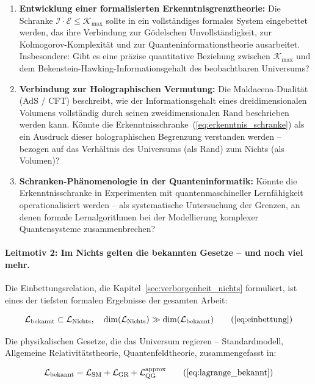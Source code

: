 ﻿\documentclass[12pt,a4paper]{report}
\begin{document}
\begin{enumerate}
	\item \textbf{Entwicklung einer formalisierten Erkenntnisgrenztheorie:} Die Schranke $\mathcal{I} \cdot \mathcal{E} \leq \mathcal{K}_{\max}$ sollte in ein vollständiges formales System eingebettet werden, das ihre Verbindung zur Gödelschen Unvollständigkeit, zur Kolmogorov-Komplexität und zur Quanteninformationstheorie ausarbeitet. Insbesondere: Gibt es eine präzise quantitative Beziehung zwischen $\mathcal{K}_{\max}$ und dem Bekenstein-Hawking-Informationsgehalt des beobachtbaren Universums?
	\item \textbf{Verbindung zur Holographischen Vermutung:} Die Maldacena-Dualität (AdS / CFT) beschreibt, wie der Informationsgehalt eines dreidimensionalen Volumens vollständig durch seinen zweidimensionalen Rand beschrieben werden kann. Könnte die Erkenntnisschranke~(\ref{eq:erkenntnis_schranke}) als ein Ausdruck dieser holographischen Begrenzung verstanden werden -- bezogen auf das Verhältnis des Universums (als Rand) zum Nichts (als Volumen)?
	\item \textbf{Schranken-Phänomenologie in der Quanteninformatik:} Könnte die Erkenntnisschranke in Experimenten mit quantenmaschineller Lernfähigkeit operationalisiert werden -- als systematische Untersuchung der Grenzen, an denen formale Lernalgorithmen bei der Modellierung komplexer Quantensysteme zusammenbrechen?
\end{enumerate}

\paragraph{Leitmotiv 2: Im Nichts gelten die bekannten Gesetze -- und noch viel mehr.}

Die Einbettungsrelation, die Kapitel~\ref{sec:verborgenheit_nichts} formuliert, ist eines der tiefsten formalen Ergebnisse der gesamten Arbeit:

\begin{equation}
	\mathcal{L}_{\text{bekannt}} \subset \mathcal{L}_{\text{Nichts}}, \quad \dim(\mathcal{L}_{\text{Nichts}}) \gg \dim(\mathcal{L}_{\text{bekannt}})
	\tag{\ref{eq:einbettung}}
\end{equation}

Die physikalischen Gesetze, die das Universum regieren -- Standardmodell, Allgemeine Relativitätstheorie, Quantenfeldtheorie, zusammengefasst in:

\begin{equation}
	\mathcal{L}_{\text{bekannt}} = \mathcal{L}_{\text{SM}} + \mathcal{L}_{\text{GR}} + \mathcal{L}_{\text{QG}}^{\text{approx}}
	\tag{\ref{eq:lagrange_bekannt}}
\end{equation}
\end{document}
